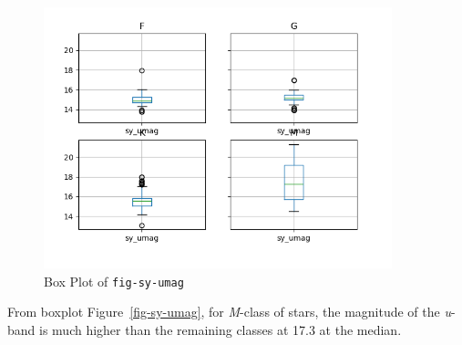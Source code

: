 \documentclass[
  letterpaper,
  DIV=11,
  numbers=noendperiod]{scrartcl}
\begin{document}
\begin{figure}[H]

{\centering \includegraphics[width=0.9\textwidth,height=\textheight]{results/figures/sy_umag.png}

}

\caption{Box Plot of \texttt{fig-sy-umag}}

\end{figure}%

From boxplot Figure~\ref{fig-sy-umag}, for \emph{M}-class of stars, the
magnitude of the \emph{u}-band is much higher than the remaining classes
at 17.3 at the median.
\end{document}
